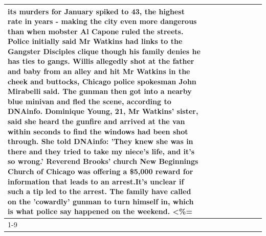 \begin{table}[H]
\begin{tabular}{lllrlllll}
its murders for January spiked to 43, the highest rate in years - making the city even more dangerous than when mobster Al Capone ruled the streets. Police initially said Mr Watkins had links to the Gangster Disciples clique though his family denies he has ties to gangs. Willis allegedly shot at the father and baby from an alley and hit Mr Watkins in the cheek and buttocks, Chicago police spokesman John Mirabelli said. The gunman then got into a nearby blue minivan and fled the scene, according to DNAinfo. Dominique Young, 21, Mr Watkins' sister, said she heard the gunfire and arrived at the van within seconds to find the windows had been shot through. She told DNAinfo: 'They knew she was in there and they tried to take my niece's life, and it's so wrong.' Reverend Brooks' church New Beginnings Church of Chicago was offering a \$5,000 reward for information that leads to an arrest.It's unclear if such a tip led to the arrest. The family have called on the 'cowardly' gunman to turn himself in, which is what police say happened on the weekend. <\%= \\
\cline{1-9}

\end{tabular}
\end{table}
